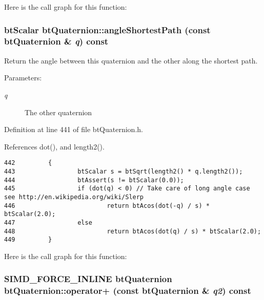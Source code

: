 Here is the call graph for this function:\hypertarget{classbt_quaternion_3160453535401db05d3926d7bc0ca5de}{
\subsubsection[angleShortestPath]{\setlength{\rightskip}{0pt plus 5cm}btScalar btQuaternion::angleShortestPath (const {\bf btQuaternion} \& {\em q}) const}}
\label{classbt_quaternion_3160453535401db05d3926d7bc0ca5de}


Return the angle between this quaternion and the other along the shortest path. 

\begin{Desc}
\item[Parameters:]
\begin{description}
\item[{\em q}]The other quaternion \end{description}
\end{Desc}


Definition at line 441 of file btQuaternion.h.

References dot(), and length2().

\begin{Code}\begin{verbatim}442         {
443                 btScalar s = btSqrt(length2() * q.length2());
444                 btAssert(s != btScalar(0.0));
445                 if (dot(q) < 0) // Take care of long angle case see http://en.wikipedia.org/wiki/Slerp
446                         return btAcos(dot(-q) / s) * btScalar(2.0);
447                 else 
448                         return btAcos(dot(q) / s) * btScalar(2.0);
449         }
\end{verbatim}
\end{Code}




Here is the call graph for this function:\hypertarget{classbt_quaternion_e59598d8706cfaaf716509f93846010e}{
\subsubsection[operator+]{\setlength{\rightskip}{0pt plus 5cm}SIMD\_\-FORCE\_\-INLINE {\bf btQuaternion} btQuaternion::operator+ (const {\bf btQuaternion} \& {\em q2}) const}}
\label{classbt_quaternion_e59598d8706cfaaf716509f93846010e}


